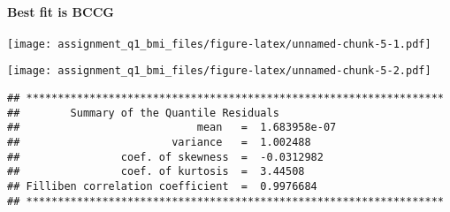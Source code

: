 \hypertarget{best-fit-is-bccg}{%
\paragraph{Best fit is BCCG}\label{best-fit-is-bccg}}

\begin{Shaded}
\begin{Highlighting}[]
\OtherTok{\textless{}{-}} \NormalTok{, }\NormalTok{, }\NormalTok{(}\NormalTok{,}\NormalTok{), }\NormalTok{(}\NormalTok{,}\NormalTok{), }
\end{Highlighting}
\end{Shaded}

\texttt{[image: assignment\_q1\_bmi\_files/figure-latex/unnamed-chunk-5-1.pdf]}

\begin{Shaded}
\begin{Highlighting}[]
\end{Highlighting}
\end{Shaded}

\texttt{[image: assignment\_q1\_bmi\_files/figure-latex/unnamed-chunk-5-2.pdf]}

\begin{verbatim}
## ******************************************************************
##        Summary of the Quantile Residuals
##                            mean   =  1.683958e-07 
##                        variance   =  1.002488 
##                coef. of skewness  =  -0.0312982 
##                coef. of kurtosis  =  3.44508 
## Filliben correlation coefficient  =  0.9976684 
## ******************************************************************
\end{verbatim}

\begin{Shaded}
\begin{Highlighting}[]
\OtherTok{\textless{}{-}} \NormalTok{, }\NormalTok{, }\NormalTok{(}\NormalTok{,}\NormalTok{), }\NormalTok{(}\NormalTok{,}\NormalTok{), }
\end{Highlighting}
\end{Shaded}


